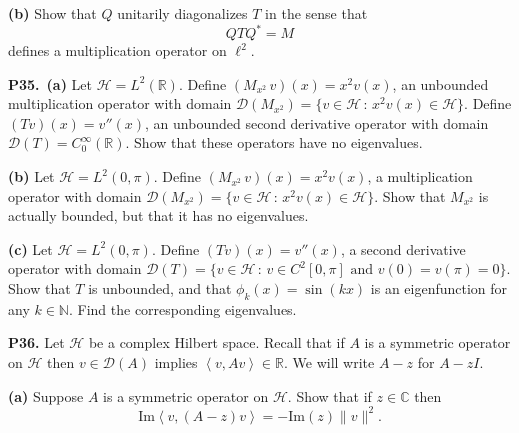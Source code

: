 \documentclass[12pt]{amsart}
\newcommand{\cD}{\mathcal{D}}
\newcommand{\cH}{\mathcal{H}}
\newcommand{\CC}{\mathbb{C}}
\newcommand{\NN}{\mathbb{N}}
\newcommand{\RR}{\mathbb{R}}
\renewcommand{\Im}{\mathrm{Im}}
\newcommand{\ip}[2]{\ensuremath{\left<#1,#2\right>}}
\newcommand{\prob}[1]{\bigskip\noindent\textbf{#1.}\quad }
\newcommand{\epart}[1]{\medskip\noindent\textbf{(#1)}\quad }
\newcommand{\ppart}[1]{\,\textbf{(#1)}\quad }
\begin{document}
\epart{b}  Show that $Q$ unitarily diagonalizes $T$ in the sense that
	$$Q T Q^* = M$$
defines a multiplication operator on $\ell^2$.

\medskip {}


\prob{P35}  \ppart{a}  Let $\cH = L^2(\RR)$.  Define $\left(M_{x^2}\, v\right)(x) = x^2 v(x)$, an unbounded multiplication operator with domain $\cD(M_{x^2}) = \{v\in\cH\,:\,x^2 v(x) \in \cH\}$.  Define $(Tv)(x) = v''(x)$, an unbounded second derivative operator with domain $\cD(T) = C_0^\infty(\RR)$.  Show that these operators have no eigenvalues.

\epart{b}  Let $\cH = L^2(0,\pi)$.  Define $\left(M_{x^2}\, v\right)(x) = x^2 v(x)$, a multiplication operator with domain $\cD(M_{x^2}) = \{v\in\cH\,:\,x^2 v(x) \in \cH\}$.  Show that $M_{x^2}$ is actually bounded, but that it has no eigenvalues.

\epart{c}  Let $\cH = L^2(0,\pi)$.  Define $(Tv)(x) = v''(x)$, a second derivative operator with domain $\cD(T) = \{v\in\cH\,:\,v \in C^2[0,\pi] \text{ and } v(0)=v(\pi)=0\}$.  Show that $T$ is unbounded, and that $\phi_k(x) = \sin(kx)$ is an eigenfunction for any $k\in\NN$. Find the corresponding eigenvalues.

\medskip {}

\medskip {}


\prob{P36}  Let $\cH$ be a complex Hilbert space.  Recall that if $A$ is a symmetric operator on $\cH$ then $v\in\cD(A)$ implies $\ip{v}{Av} \in \RR$.  We will write $A-z$ for $A-zI$.

\epart{a}  Suppose $A$ is a symmetric operator on $\cH$.  Show that if $z\in\CC$ then
	$$\Im \ip{v}{(A-z)v} = - \Im(z) \|v\|^2.$$
\end{document}
